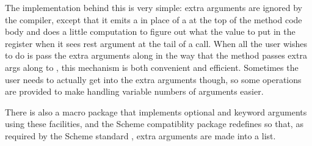 The implementation behind this is very simple: extra arguments are
ignored by the compiler, except that it emits a 
in place of a  at the top of the method code body and
does a little computation to figure out what the value to put in the
 register when it sees rest argument at the tail of a call.
When all the user wishes to do is pass the extra arguments along in
the way that the  method passes extra args along to
, this mechanism is both convenient and efficient.
Sometimes the user needs to actually get into the extra arguments
though, so some operations are provided to make handling variable
numbers of arguments easier.



There is also a macro package that implements optional and keyword
arguments using these facilities, and the Scheme compatiblity package
redefines  so that, as required by the Scheme standard
\citep{R3RS}, extra arguments are made into a list.
